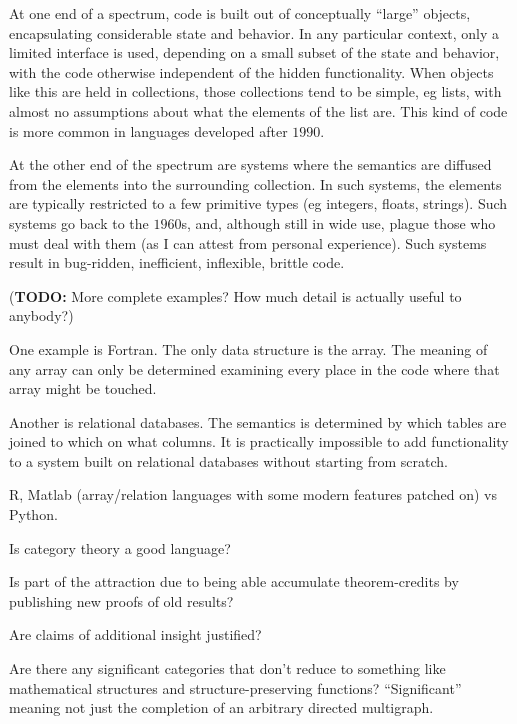 \documentclass[11pt]{book}
\begin{document}
At one end of a spectrum, code is built out of conceptually 
``large'' objects, encapsulating considerable state and
behavior. In any particular context, only a limited interface
is used, depending on a small subset of the state and behavior,
with the code otherwise independent of the hidden functionality.
When objects like this are held in collections, those collections
tend to be simple, eg lists, with almost no assumptions
about what the elements of the list are.
This kind of code is more common in languages developed 
after $1990$.

At the other end of the spectrum are systems where the semantics
are diffused from the elements into the surrounding collection.
In such systems, the elements are typically restricted 
to a few primitive types (eg integers, floats, strings).
Such systems go back to the $1960$s, 
and, although still in wide use,
plague those who must deal with them (as I can attest from personal
experience).
Such systems result in bug-ridden, inefficient, 
inflexible, brittle code.

(\textbf{TODO:} More complete examples? 
How much detail is actually useful to anybody?)

One example is Fortran. The only data structure is the array.
The meaning of any array can only be determined examining every
place in the code where that array might be touched.

Another is relational databases. The semantics is determined
by which tables are joined to which on what columns.
It is practically impossible to add functionality to a system
built on relational databases without starting from scratch.

R, Matlab (array/relation languages with some modern features
patched on) vs Python.



\label{sec:Right-abstraction}

Is category theory a good language?~\cite{wiki_2020_abstract_nonsense}

Is part of the attraction due to being able accumulate
theorem-credits by publishing
new proofs of old results?

Are claims of additional insight justified?

Are there any significant categories 
that don't reduce to something like mathematical structures
and structure-preserving functions?
``Significant'' meaning not just the completion of an arbitrary
directed multigraph.
\end{document}
